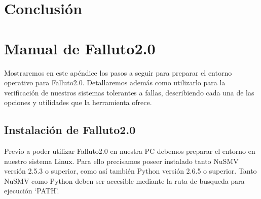 \documentclass[titlepage, 12pt]{book}
\begin{document}



\chapter{Conclusi\'on}



\appendix
\appendixpage
\noappendicestocpagenum
\addappheadtotoc

\chapter{Manual de Falluto2.0}
Mostraremos en este ap\'endice los pasos a seguir para preparar el entorno operativo para Falluto2.0. Detallaremos adem\'as como utilizarlo para la verificaci\'on de nuestros sistemas tolerantes a fallas, describiendo cada una de las opciones y utilidades que la herramienta ofrece.

\section{Instalaci\'on de Falluto2.0}
Previo a poder utilizar Falluto2.0 en nuestra PC debemos preparar el entorno en nuestro sistema Linux. Para ello precisamos poseer instalado tanto NuSMV versi\'on 2.5.3 o superior, como as\'i tambi\'en Python versi\'on 2.6.5 o superior. Tanto NuSMV como Python deben ser accesible mediante la ruta de busqueda para ejecuci\'on `PATH'.
\end{document}
